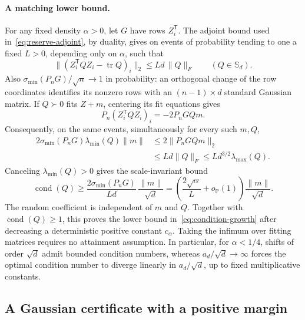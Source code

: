 \documentclass[11pt]{article}
\newcommand{\Pbb}{\mathbb P}
\newcommand{\Sym}{\mathbb S}
\DeclareMathOperator{\tr}{tr}
\DeclareMathOperator{\cond}{cond}
\newcommand{\norm}[1]{\lVert#1\rVert}
\newcommand{\oP}{o_{\Pbb}}
\theoremstyle{remark}
\begin{document}
\paragraph{A matching lower bound.}
For any fixed density $\alpha>0$, let $G$ have rows $Z_i^{\mathsf T}$.
The adjoint bound used in~\eqref{eq:reserve-adjoint}, by duality, gives
on events of probability tending to one a fixed $L>0$, depending only
on $\alpha$, such that
\[
 \norm{(Z_i^{\mathsf T}QZ_i-\tr Q)_i}_2
       \le Ld\,\norm Q_F\qquad(Q\in\Sym_d).
\]
Also $\sigma_{\min}(P_nG)/\sqrt n\to1$ in probability: an orthogonal
change of the row coordinates identifies its nonzero rows with an
$(n-1)\times d$ standard Gaussian matrix. If $Q\succ0$ fits $Z+m$,
centering its fit equations gives
\[
 P_n(Z_i^{\mathsf T}QZ_i)_i=-2P_nGQm.
\]
Consequently, on the same events, simultaneously for every such $m,Q$,
\begin{align*}
 2\sigma_{\min}(P_nG)\lambda_{\min}(Q)\norm m
 &\le2\norm{P_nGQm}_2\\
 &\le Ld\norm Q_F
 \le Ld^{3/2}\lambda_{\max}(Q).
\end{align*}
Canceling $\lambda_{\min}(Q)>0$ gives the scale-invariant bound
\begin{equation}\label{eq:condition-lower}
 \cond(Q)\ge
 \frac{2\sigma_{\min}(P_nG)}{Ld}\,
       \frac{\norm m}{\sqrt d}
 =\left(\frac{2\sqrt\alpha}{L}+\oP(1)\right)
       \frac{\norm m}{\sqrt d}.
\end{equation}
The random coefficient is independent of $m$ and $Q$. Together with
$\cond(Q)\ge1$, this proves the lower bound
in~\eqref{eq:condition-growth} after decreasing a deterministic positive
constant $c_\alpha$. Taking the infimum over fitting matrices requires
no attainment assumption. In particular, for $\alpha<1/4$, shifts of
order $\sqrt d$ admit bounded condition numbers, whereas
$a_d/\sqrt d\to\infty$ forces the optimal condition number to diverge
linearly in $a_d/\sqrt d$, up to fixed multiplicative constants.

\subsection{A Gaussian certificate with a positive margin}
\end{document}
